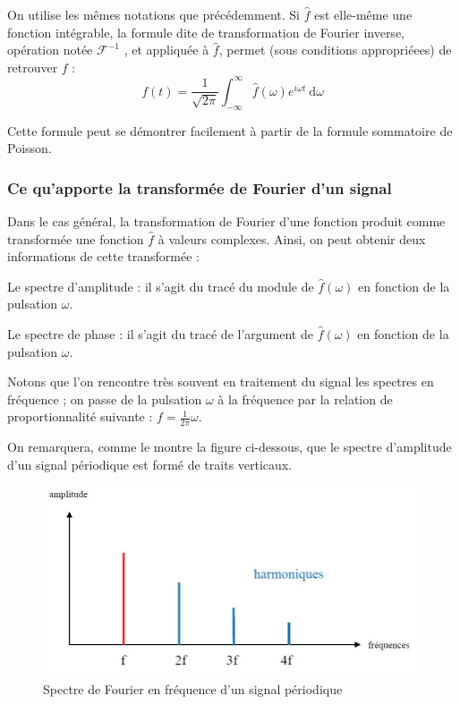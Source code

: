 On utilise les mêmes notations que précédemment.
Si $\hat{f}$ est elle-même une fonction intégrable, la formule dite de transformation de Fourier inverse, opération notée $\mathcal{F}^{-1}$ , et appliquée à $\hat{f}$, permet (sous conditions appropriéees) de retrouver $f$ :
$$ f(t)=\displaystyle{\frac{1}{\sqrt{2\pi}}\int_{-\infty}^{\infty}\hat{f}(\omega)e^{i\omega t}\:\mathrm{d}\omega}$$

Cette formule peut se démontrer facilement à partir de la formule sommatoire de Poisson.

\subsubsection{Ce qu'apporte la transformée de Fourier d'un signal}
Dans le cas général, la transformation de Fourier d'une fonction produit comme transformée une fonction $\hat{f}$ à valeurs complexes. Ainsi, on peut obtenir deux informations de cette transformée :

Le spectre d'amplitude : il s'agit du tracé du module de $\hat{f}(\omega)$ en fonction de la pulsation $\omega$.

Le spectre de phase :  il s'agit du tracé de l'argument de $\hat{f}(\omega)$ en fonction de la pulsation $\omega$.

Notons que l'on rencontre très souvent en traitement du signal les spectres en fréquence ; on passe de la pulsation $\omega$ à la fréquence par la relation de proportionnalité suivante : $f=\displaystyle \frac{1}{2\pi}\omega $.

On remarquera, comme le montre la figure ci-dessous, que le spectre d'amplitude d'un signal périodique est formé de traits verticaux.
\begin{figure}[!h]
\centering
\includegraphics[scale=0.4]{spectre.jpg}
\caption{Spectre de Fourier en fréquence d'un signal périodique}
\end{figure}

